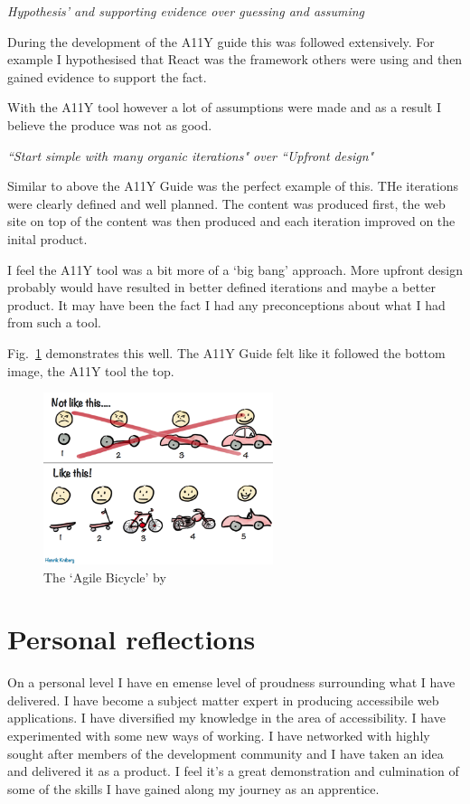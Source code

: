 \begin{center}
\textit{Hypothesis’ and supporting evidence over guessing and assuming}
\end{center}
During the development of the A11Y guide this was followed extensively. For
example I hypothesised that React was the framework others were using and
then gained evidence to support the fact.

With the A11Y tool however a lot of assumptions were made and as a result I
believe the produce was not as good.

\begin{center}
\textit{``Start simple with many organic iterations" over ``Upfront design"}
\end{center}
Similar to above the A11Y Guide was the perfect example of this. THe
iterations were clearly defined and well planned. The content was produced
first, the web site on top of the content was then produced and each
iteration improved on the inital product.

I feel the A11Y tool was a bit more of a `big bang' approach. More upfront
design probably would have resulted in better defined iterations and maybe a
better product. It may have been the fact I had any preconceptions about what
I had from such a tool.

Fig.~\ref{fig:agile_bicycle} demonstrates this well. The A11Y Guide felt like
it followed the bottom image, the A11Y tool the top.

\begin{figure}[H]
\centering
\includegraphics[width=0.6\textwidth]{figures/agile_bicycle}
\captionsetup{justification=centering}
\caption{The `Agile Bicycle' by \citep{bicycle}
\label{fig:agile_bicycle}}
\end{figure}

\section{Personal reflections}
On a personal level I have en emense level of proudness surrounding what I
have delivered. I have become a subject matter expert in producing
accessibile web applications. I have diversified my knowledge in the area of
accessibility. I have experimented with some new ways of working. I have
networked with highly sought after members of the development community and I
have taken an idea and delivered it as a product. I feel it's a great
demonstration and culmination of some of the skills I have gained along my
journey as an apprentice.
